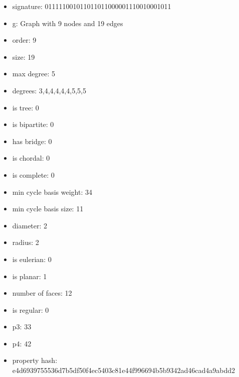 \newpage
\begin{figure}
\end{figure}
\begin{itemize}
\item signature: 011111001011011011000001110010001011
\item g: Graph with 9 nodes and 19 edges
\item order: 9
\item size: 19
\item max degree: 5
\item degrees: 3,4,4,4,4,4,5,5,5
\item is tree: 0
\item is bipartite: 0
\item has bridge: 0
\item is chordal: 0
\item is complete: 0
\item min cycle basis weight: 34
\item min cycle basis size: 11
\item diameter: 2
\item radius: 2
\item is eulerian: 0
\item is planar: 1
\item number of faces: 12
\item is regular: 0
\item p3: 33
\item p4: 42
\item property hash: e4d6939755536d7b5df50f4ec5403c81e44f996694b5b9342ad46cad4a9abdd2
\end{itemize}
